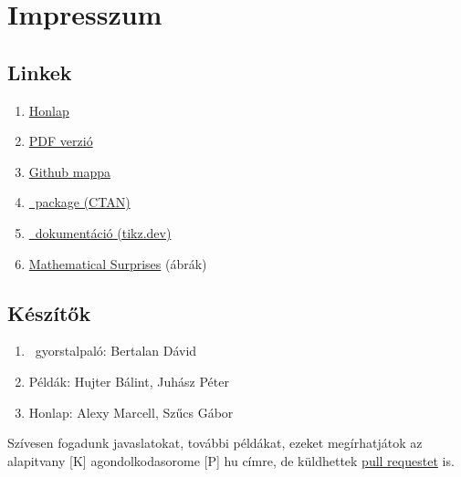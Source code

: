 \chapter{Impresszum}

\section{Linkek}
\begin{enumerate}
    \item[] \href{./index.html}{Honlap}
    \item[] \href{./mainpage.pdf}{PDF verzió}
    \item[] \href{https://github.com/a-gondolkodas-orome/tikz-tutorial}{Github mappa} 
    \item[] \href{https://ctan.ijs.si/tex-archive/graphics/pgf/base/doc/pgfmanual.pdf}{\tikzname\ package (CTAN)} 
    \item[] \href{https://tikz.dev/}{\tikzname\ dokumentáció (tikz.dev)} 
    \item[] \href{https://github.com/motib/surprises}{Mathematical Surprises} (ábrák)
\end{enumerate}
        
\section{Készítők}
\begin{enumerate}
    \item[] \tikzname\ gyorstalpaló: Bertalan Dávid
    \item[] Példák: Hujter Bálint, Juhász Péter
    \item[] Honlap: Alexy Marcell, Szűcs Gábor
\end{enumerate}

Szívesen fogadunk javaslatokat, további példákat, ezeket megírhatjátok az alapitvany [K] agondolkodasorome [P] hu címre, de küldhettek \href{https://github.com/a-gondolkodas-orome/tikz-tutorial/pulls}{pull requestet} is. 
